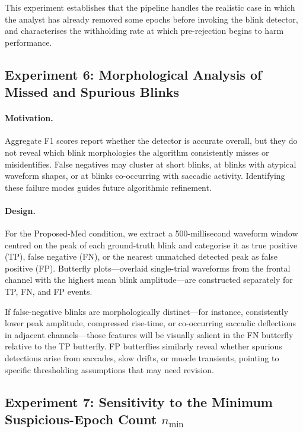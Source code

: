 This experiment establishes that the pipeline handles the realistic case in which
the analyst has already removed some epochs before invoking the blink detector,
and characterises the withholding rate at which pre-rejection begins to harm
performance.

\subsection{Experiment 6: Morphological Analysis of Missed and Spurious Blinks}
\label{sec:exp9}

\paragraph{Motivation.}
Aggregate F1 scores report whether the detector is accurate overall, but they do
not reveal which blink morphologies the algorithm consistently misses or
misidentifies.
False negatives may cluster at short blinks, at blinks with atypical waveform
shapes, or at blinks co-occurring with saccadic activity.
Identifying these failure modes guides future algorithmic refinement.

\paragraph{Design.}
For the Proposed-Med condition, we extract a 500-millisecond waveform window
centred on the peak of each ground-truth blink and categorise it as true positive
(TP), false negative (FN), or the nearest unmatched detected peak as false
positive (FP).
Butterfly plots---overlaid single-trial waveforms from the frontal channel with
the highest mean blink amplitude---are constructed separately for TP, FN, and FP
events.

If false-negative blinks are morphologically distinct---for instance,
consistently lower peak amplitude, compressed rise-time, or co-occurring
saccadic deflections in adjacent channels---those features will be visually
salient in the FN butterfly relative to the TP butterfly.
FP butterflies similarly reveal whether spurious detections arise from saccades,
slow drifts, or muscle transients, pointing to specific thresholding assumptions
that may need revision.

\subsection{Experiment 7: Sensitivity to the Minimum Suspicious-Epoch Count $n_{\min}$}
\label{sec:exp6}

